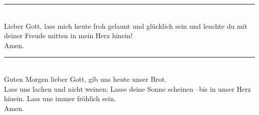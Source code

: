 \par\noindent\rule{\textwidth}{0.4pt}\\ \newline \newline
Lieber Gott, lass mich heute froh gelaunt und glücklich sein und leuchte du mit deiner Freude mitten in mein Herz hinein! \\ \newline
Amen.\\
\par\noindent\rule{\textwidth}{0.4pt}\\ \newline \newline
Guten Morgen lieber Gott, gib uns heute unser Brot.\\ 
Lass uns lachen und nicht weinen; Lasse deine Sonne scheinen –bis in unser Herz hinein. Lass uns immer fröhlich sein. \\ \newline
Amen.\\


